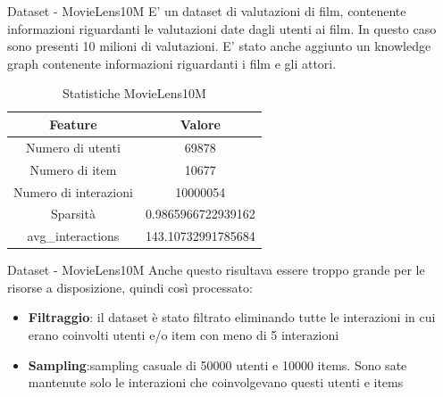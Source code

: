 \begin{frame}{Dataset - MovieLens10M}
    \small
    E' un dataset di valutazioni di film, contenente informazioni riguardanti le valutazioni date dagli utenti ai film. In questo caso sono presenti 10 milioni di valutazioni. E' stato anche aggiunto un knowledge graph contenente informazioni riguardanti i film e gli attori.
    
    \begin{table}[H]
    \centering
    \begin{tabular}{|c|c|}
    \hline
    \textbf{Feature} & \textbf{Valore} \\
    \hline
    Numero di utenti & 69878 \\
    \hline
    Numero di item & 10677 \\
    \hline
    Numero di interazioni & 10000054 \\
    \hline
    Sparsità & 0.9865966722939162 \\
    \hline
    avg\_interactions & 143.10732991785684 \\
    \hline
    \end{tabular}
    \caption{Statistiche MovieLens10M}
    \end{table}
    \end{frame}
    
    \begin{frame}{Dataset - MovieLens10M}
        Anche questo risultava essere troppo grande per le risorse a disposizione, quindi così processato:
        \begin{itemize}
            \item  \textbf{Filtraggio}: il dataset è stato filtrato eliminando tutte le interazioni in cui erano coinvolti utenti e/o item
            con meno di 5 interazioni
            \item  \textbf{Sampling}:sampling casuale di 50000 utenti e 10000 items. Sono sate mantenute solo le interazioni che coinvolgevano questi utenti e items
        \end{itemize}
    \end{frame}


